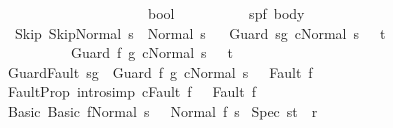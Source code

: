 \begin{isabellebody}
\ \ \ \ \ \ \ \ \ \ \ \ \ \ \ \ \ \ \ \ {\isasymRightarrow}\ bool{\isachardoublequoteclose}\ {\isacharparenleft}{\isachardoublequoteopen}{\isacharunderscore}{\isasymturnstile}\ {\isasymlangle}{\isacharunderscore}{\isacharcomma}{\isacharunderscore}{\isasymrangle}\ {\isasymRightarrow}\ {\isacharunderscore}{\isachardoublequoteclose}\ \ {\isacharbrackleft}{}{}{\isacharcomma}{}{}{\isacharcomma}{}{}{\isacharcomma}{}{}{\isacharbrackright}\ {}{}{\isacharparenright}\isanewline
\ \ \ {\isasymGamma}{\isacharcolon}{\isacharcolon}{\isachardoublequoteopen}{\isacharparenleft}{\isacharprime}s{\isacharcomma}{\isacharprime}p{\isacharcomma}{\isacharprime}f{\isacharparenright}\ body{\isachardoublequoteclose}\isanewline
{}\isanewline
\ \ Skip{\isacharcolon}\ {\isachardoublequoteopen}{\isasymGamma}{\isasymturnstile}{\isasymlangle}Skip{\isacharcomma}Normal\ s{\isasymrangle}\ {\isasymRightarrow}\ Normal\ s{\isachardoublequoteclose}\isanewline
\ \isanewline
{\isacharbar}\ Guard{\isacharcolon}\ {\isachardoublequoteopen}{\isasymlbrakk}s{\isasymin}g{\isacharsemicolon}\ {\isasymGamma}{\isasymturnstile}{\isasymlangle}c{\isacharcomma}Normal\ s{\isasymrangle}\ {\isasymRightarrow}\ \ t{\isasymrbrakk}\ \isanewline
\ \ \ \ \ \ \ \ \ \ {\isasymLongrightarrow}\ \isanewline
\ \ \ \ \ \ \ \ \ \ {\isasymGamma}{\isasymturnstile}{\isasymlangle}Guard\ f\ g\ c{\isacharcomma}Normal\ s{\isasymrangle}\ {\isasymRightarrow}\ \ t{\isachardoublequoteclose}\isanewline
\isanewline
{\isacharbar}\ GuardFault{\isacharcolon}\ {\isachardoublequoteopen}s{\isasymnotin}g\ {\isasymLongrightarrow}\ {\isasymGamma}{\isasymturnstile}{\isasymlangle}Guard\ f\ g\ c{\isacharcomma}Normal\ s{\isasymrangle}\ {\isasymRightarrow}\ \ Fault\ f{\isachardoublequoteclose}\isanewline
\isanewline
{\isacharbar}\ FaultProp\ {\isacharbrackleft}intro{\isacharcomma}simp{\isacharbrackright}{\isacharcolon}\ {\isachardoublequoteopen}{\isasymGamma}{\isasymturnstile}{\isasymlangle}c{\isacharcomma}Fault\ f{\isasymrangle}\ {\isasymRightarrow}\ \ Fault\ f{\isachardoublequoteclose}\ \isanewline
\isanewline
{\isacharbar}\ Basic{\isacharcolon}\ {\isachardoublequoteopen}{\isasymGamma}{\isasymturnstile}{\isasymlangle}Basic\ f{\isacharcomma}Normal\ s{\isasymrangle}\ {\isasymRightarrow}\ \ Normal\ {\isacharparenleft}f\ s{\isacharparenright}{\isachardoublequoteclose}\isanewline
\isanewline
{\isacharbar}\ Spec{\isacharcolon}\ {\isachardoublequoteopen}{\isacharparenleft}s{\isacharcomma}t{\isacharparenright}\ {\isasymin}\ r\ \isanewline

\end{isabellebody}
